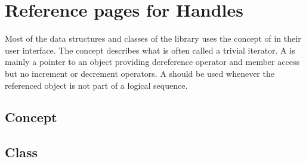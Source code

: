 
\section{Reference pages for Handles}

Most of the data structures and classes of the \cgal library
uses the concept of  in their user interface.
The concept  describes what is    often called 
a trivial iterator.  
A  is
mainly   a pointer to an object providing 
dereference operator  and 
member access  but no increment or decrement 
operators.
A   should be used whenever the referenced
object
is not part of a logical sequence.
 
\subsection*{Concept}

\subsection*{Class}
